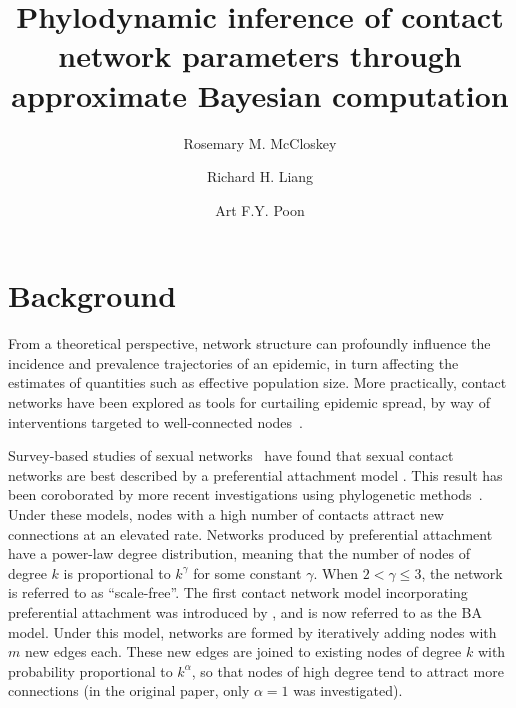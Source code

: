 \documentclass[12pt]{article}\usepackage[]{graphicx}\usepackage[]{color}
\title{Phylodynamic inference of contact network parameters through approximate
Bayesian computation}
\author{Rosemary M. McCloskey \and Richard H. Liang \and Art F.Y. Poon}
\begin{document}
\maketitle



\section*{Background}

From a theoretical perspective, network structure can profoundly influence the
incidence and prevalence trajectories of an epidemic, in turn affecting the
estimates of quantities such as effective population size. More practically,
contact networks have been explored as tools for curtailing epidemic spread, by
way of interventions targeted to well-connected
nodes~\autocite{little2014using}.

Survey-based studies of sexual networks~\autocite{liljeros2001web,
schneeberger2004scale} have found that sexual contact networks are best
described by a preferential attachment model \autocite[but not all,
see][]{jones2003assessment}. This result has been coroborated by more recent
investigations using phylogenetic methods~\autocite{brown2011transmission}.
Under these models, nodes with a high number of contacts attract new
connections at an elevated rate. Networks produced by preferential attachment
have a power-law degree distribution, meaning that the number of nodes of
degree $k$ is proportional to $k^\gamma$ for some constant $\gamma$. When $2 <
\gamma \leq 3$, the network is referred to as ``scale-free''. The first contact
network model incorporating preferential attachment was introduced by
\textcite{barabasi1999emergence}, and is now referred to as the \gls{BA} model.
Under this model, networks are formed by iteratively adding nodes with $m$ new
edges each. These new edges are joined to existing nodes of degree $k$ with
probability proportional to $k^\alpha$, so that nodes of high degree tend to
attract more connections (in the original paper, only $\alpha = 1$ was
investigated).
\end{document}
